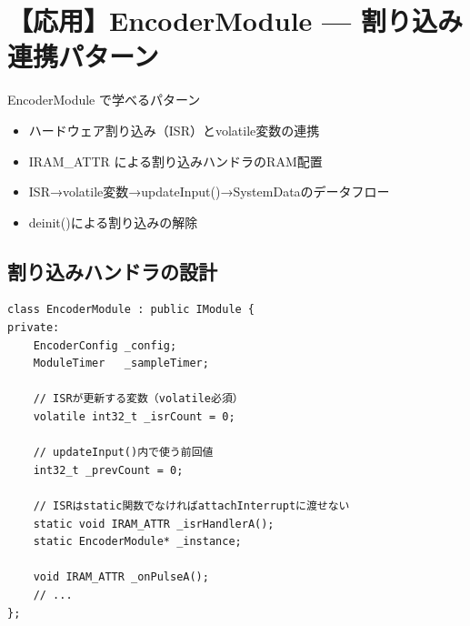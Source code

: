 \section{【応用】EncoderModule — 割り込み連携パターン}

\begin{patternbox}{EncoderModule で学べるパターン}
\begin{itemize}
    \item ハードウェア割り込み（ISR）とvolatile変数の連携
    \item IRAM\_ATTR による割り込みハンドラのRAM配置
    \item ISR→volatile変数→updateInput()→SystemDataのデータフロー
    \item deinit()による割り込みの解除
\end{itemize}
\end{patternbox}

\subsection{割り込みハンドラの設計}

\begin{lstlisting}[style=cppstyle, caption={EncoderModule.h — 割り込み関連}]
class EncoderModule : public IModule {
private:
    EncoderConfig _config;
    ModuleTimer   _sampleTimer;

    // ISRが更新する変数（volatile必須）
    volatile int32_t _isrCount = 0;

    // updateInput()内で使う前回値
    int32_t _prevCount = 0;

    // ISRはstatic関数でなければattachInterruptに渡せない
    static void IRAM_ATTR _isrHandlerA();
    static EncoderModule* _instance;

    void IRAM_ATTR _onPulseA();
    // ...
};
\end{lstlisting}

